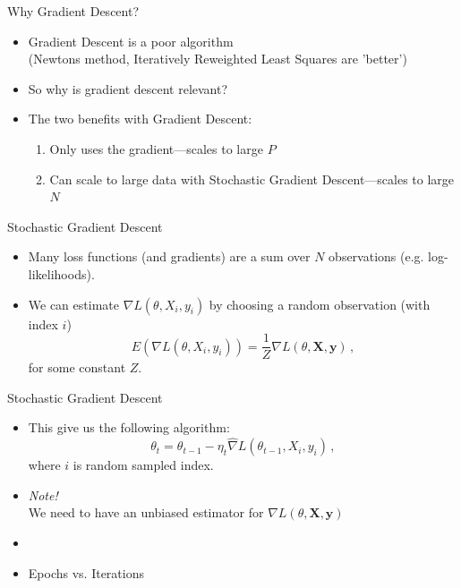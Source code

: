 \documentclass[10pt]{beamer}
\begin{document}
\begin{frame}{Why Gradient Descent?}


\begin{itemize}
\item Gradient Descent is a poor algorithm \\ (Newtons method, Iteratively Reweighted Least Squares are 'better')
\item So why is gradient descent relevant?\pause
\item The two benefits with Gradient Descent:
\begin{enumerate}
\item Only uses the gradient---scales to large $P$
\item Can scale to large data with Stochastic Gradient Descent---scales to large $N$
\end{enumerate}
\end{itemize}

\end{frame}


\begin{frame}{Stochastic Gradient Descent}


\begin{itemize}
\item Many loss functions (and gradients) are a sum over $N$ observations (e.g. log-likelihoods).
\pause
\item We can estimate $\nabla L(\theta, X_{i}, y_{i})$ by choosing a random observation (with index $i$)
\[
E(\nabla L(\theta, X_{i}, y_{i})) = \frac{1}{Z} \nabla L(\theta, \mathbf{X}, \mathbf{y})\,,
\]
for some constant $Z$.
\end{itemize}


\end{frame}


\begin{frame}{Stochastic Gradient Descent}


\begin{itemize}
\item This give us the following algorithm:
\[
\theta_t = \theta_{t-1} - \eta_t \hat{\nabla} L(\theta_{t-1}, X_{i}, y_{i})\,,
\]
where $i$ is random sampled index.
\item \emph{Note!} \\We need to have an unbiased estimator for $\nabla L(\theta, \mathbf{X}, \mathbf{y})$
\pause
\item {}\pause
\item Epochs vs. Iterations
\end{itemize}


\end{frame}
\end{document}
